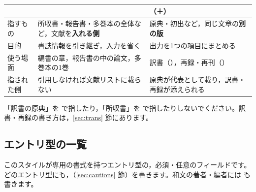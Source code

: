 \begin{center}\small
\begin{tabular}{@{}L{0.14\textwidth}L{0.36\textwidth}L{0.36\textwidth}@{}}
\toprule
 &  & （＋） \\
\midrule
指すもの & 所収書・報告書・多巻本の全体など，文献を\textbf{入れる側} & 原典・初出など，同じ文章の\textbf{別の版} \\
目的 & 書誌情報を引き継ぎ，入力を省く & 出力を1つの項目にまとめる \\
使う場面 & 編書の章，報告書の中の論文，多巻本の1巻 & 訳書（），再録・再刊（） \\
指された側 & 引用しなければ文献リストに載らない & 原典が代表として載り，訳書・再録が添えられる \\
\bottomrule
\end{tabular}
\end{center}

「訳書の原典」を  で指したり，「所収書」を  で指したりしないでください。訳書・再録の書き方は，\ref{sec:trans} 節にあります。

\subsection{エントリ型の一覧}\label{sec:types}
このスタイルが専用の書式を持つエントリ型の，必須・任意のフィールドです。どのエントリ型にも，（\ref{sec:cautions} 節）を書きます。和文の著者・編者には  も書きます。

